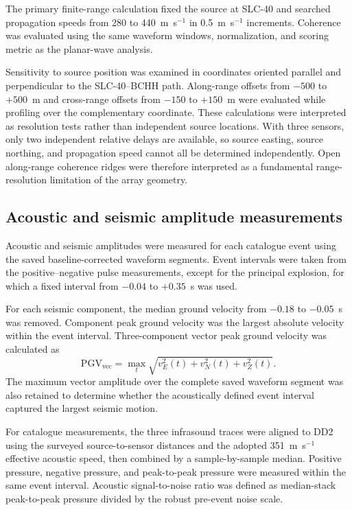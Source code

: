 \documentclass[]{seismica}
\begin{document}
The primary finite-range calculation fixed the source at SLC-40 and searched propagation speeds from 280 to 440~m~s$^{-1}$ in 0.5~m~s$^{-1}$ increments. Coherence was evaluated using the same waveform windows, normalization, and scoring metric as the planar-wave analysis.

Sensitivity to source position was examined in coordinates oriented parallel and perpendicular to the SLC-40--BCHH path. Along-range offsets from $-500$ to $+500$~m and cross-range offsets from $-150$ to $+150$~m were evaluated while profiling over the complementary coordinate. These calculations were interpreted as resolution tests rather than independent source locations. With three sensors, only two independent relative delays are available, so source easting, source northing, and propagation speed cannot all be determined independently. Open along-range coherence ridges were therefore interpreted as a fundamental range-resolution limitation of the array geometry.

\subsection{Acoustic and seismic amplitude measurements}

Acoustic and seismic amplitudes were measured for each catalogue event using
the saved baseline-corrected waveform segments. Event intervals were taken from
the positive--negative pulse measurements, except for the principal explosion,
for which a fixed interval from $-0.04$ to $+0.35$~s was used.

For each seismic component, the median ground velocity from $-0.18$ to $-0.05$~s was removed. Component peak ground velocity was the largest absolute velocity within the event interval. Three-component vector peak ground velocity was calculated as
\begin{equation}
  \mathrm{PGV}_{\mathrm{vec}} = \max_t\sqrt{v_E^2(t)+v_N^2(t)+v_Z^2(t)}.
  \label{eq:vector_pgv}
\end{equation}
The maximum vector amplitude over the complete saved waveform segment was also retained to determine whether the acoustically defined event interval captured the largest seismic motion.

For catalogue measurements, the three infrasound traces were aligned to DD2
using the surveyed source-to-sensor distances and the adopted
351~m~s$^{-1}$ effective acoustic speed, then combined by a sample-by-sample
median. Positive pressure, negative pressure, and peak-to-peak pressure were
measured within the same event interval. Acoustic signal-to-noise ratio was
defined as median-stack peak-to-peak pressure divided by the robust pre-event
noise scale.
\end{document}
